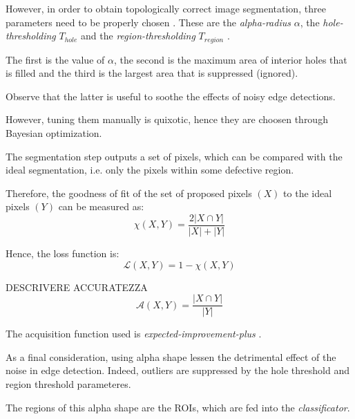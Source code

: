         \par{
            However, in order to obtain topologically correct image segmentation, three parameters need to be properly chosen \cite{springer:10.1007/11907350_46}. These are the \emph{alpha-radius} $\alpha$, the \emph{hole-thresholding} $T_{hole}$ and the \emph{region-thresholding} $T_{region}$ \cite{matlab:alpha-shape}.
        }
        \par{
            The first is the value of $\alpha$, the second is the maximum area of interior holes that is filled and the third is the largest area that is suppressed (ignored).
        }
        \par{
            Observe that the latter is useful to soothe the effects of noisy edge detections.
        }
        \par{
            However, tuning them manually is quixotic, hence they are choosen through Bayesian optimization.
        }
        \par{
            The segmentation step outputs a set of pixels, which can be compared with the ideal segmentation, i.e. only the pixels within some defective region.
        }
        \par{
            Therefore, the goodness of fit of the set of proposed pixels $\left(X\right)$ to the ideal pixels $\left(Y\right)$ can be measured as:
            \begin{equation*}
                \chi\left(X, Y\right) = \frac{2 \lvert X \cap Y \rvert}{\lvert X \rvert + \lvert Y \rvert}
            \end{equation*}
        }
        \par{
            Hence, the loss function is:
            \begin{equation*}
                \mathcal{L}\left(X, Y\right) = 1 - \chi\left(X, Y\right)
            \end{equation*}
        }
	    \par{
		    DESCRIVERE ACCURATEZZA
		    \begin{equation*}
		    \mathcal{A}\left(X, Y\right) = \frac{\lvert X \cap Y \rvert}{\lvert Y \rvert}
		    \end{equation*}
		}
        \par{
            The acquisition function used is \emph{expected-improvement-plus} \cite{matlab:acquisition}.
        }
        \par{
            As a final consideration, using alpha shape lessen the detrimental effect of the noise in edge detection. Indeed, outliers are suppressed by the hole threshold and region threshold parameteres.
        }
        \par{
            The regions of this alpha shape are the ROIs, which are fed into the \emph{classificator}.
        }
